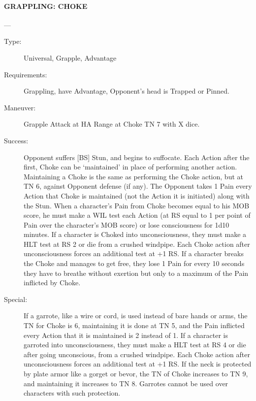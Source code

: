 \documentclass[oneside,11pt,english]{book}
\begin{document}
\paragraph{\large\label{man:GRAPPLING: CHOKE} GRAPPLING: CHOKE}---\quad{\large[X]}
\vspace{-10pt}\begin{description} 
\item [Type:] Universal, Grapple, Advantage 
\item [Requirements:] Grappling, have Advantage, Opponent's head is Trapped or Pinned. 
\item [Maneuver:] Grapple Attack at HA Range at Choke TN 7 with X dice. 
\item [Success:] Opponent suffers [BS] Stun, and begins to suffocate. 
Each Action after the first, Choke can be ‘maintained’ in place of performing another action. Maintaining 
a Choke is the same as performing the Choke action, but at TN 6, against Opponent defense (if any). The 
Opponent takes 1 Pain every Action that Choke is maintained (not the Action it is initiated) along with 
the Stun. 
When a character's Pain from Choke becomes equal to his MOB score, he must make a WIL test each 
Action (at RS equal to 1 per point of Pain over the character's MOB score) or lose consciousness for 1d10 
minutes. If a character is Choked into unconsciousness, they must make a HLT test at RS 2 or die from a 
crushed windpipe. Each Choke action after unconsciousness forces an additional test at +1 RS. 
If a character breaks the Choke and manages to get free, they lose 1 Pain for every 10 seconds they have 
to breathe without exertion but only to a maximum of the Pain inflicted by Choke. 
\item [Special:] If a garrote, like a wire or cord, is used instead of bare hands or arms, the TN for Choke is 6, 
maintaining it is done at TN 5, and the Pain inflicted every Action that it is maintained is 2 instead of 1. If 
a character is garroted into unconsciousness, they must make a HLT test at RS 4 or die after going 
unconscious, from a crushed windpipe. Each Choke action after unconsciousness forces an additional test 
at +1 RS.
If the neck is protected by plate armor like a gorget or bevor, the TN of Choke increases to TN 9, and 
maintaining it increases to TN 8. Garrotes cannot be used over characters with such protection. 
\end{description}
\end{document}
